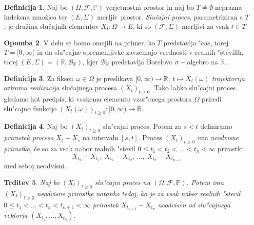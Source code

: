\documentclass[12pt, a4paper, reqno]{amsart}
\theoremstyle{definition} %
\newtheorem{definicija}{Definicija}[section]
\newtheorem{opomba}[definicija]{Opomba}
\theoremstyle{plain} %
\newtheorem{trditev}[definicija]{Trditev}
\newcommand{\R}{\mathbb{R}}
\newcommand{\F}{\mathcal{F}}
\newcommand{\B}{\mathcal{B}}
\newcommand{\1}{\mathds{1}}
\begin{document}
    \noindent


    \begin{definicija}
        Naj bo $(\Omega, \mathcal{F}, \mathbb{P})$ verjetnostni prostor in naj bo $T\neq\emptyset$
        neprazna indeksna množica ter $(E, \Sigma)$ merljiv prostor. \textit{Slučajni proces}, 
        parametriziran s $T$, je družina slučajnih elementov $X_t : \Omega \to E$,
         ki so $(\mathcal{F}, \Sigma)$-merljivi za vsak $t \in T$.
        \label{def:slucProc}
    \end{definicija}

    \begin{opomba}
        V delu se bomo omejili na primer, ko $T$ predstavlja "cas, torej $T = [0, \infty)$ in da slu"cajne
        spremenljivke 
        zavzemajo vrednosti v realnih "stevilih, torej $(E, \Sigma) = (\R, \B_{\R})$, kjer $\B_\R$ 
        predstavlja Borelovo $\sigma-$algebro na $\R$.
        \label{op:Konvencije}
    \end{opomba}


    \begin{definicija}
        Za fiksen $\omega \in \Omega$ je preslikava 
        $[0, \infty) \rightarrow \mathbb{R}; \ t \mapsto X_t(\omega)$ 
        \textit{trajektorija} oziroma \textit{realizacija} slučajnega procesa $(X_t)_{t\geq0}$.
        Tako lahko slu"cajni proces gledamo kot predpis, ki vsakemu elementu vzor"cnega prostora 
        $\Omega$ priredi slu"cajno funkcijo
        $(X_t(\omega))_{t\geq0}: [0, \infty) \rightarrow \mathbb{R}$.
        \label{def:realizac}
    \end{definicija}

    \begin{definicija}
        Naj bo $(X_t)_{t\geq0}$ slu"cajni proces. Potem za $s < t$ definiramo
        \textit{prirastek procesa} $X_t - X_s$ na intervalu $[s, t]$. Proces $(X_t)_{t\geq0}$ ima 
        \textit{neodvisne prirastke}, če so za vsak nabor realnih "stevil
        $0 \leq t_1 < t_2 < \ldots < t_n < \infty$ prirastki
        $$
            X_{t_2} - X_{t_1}, \ X_{t_3} - X_{t_2}, \ \ldots, \ X_{t_n} - X_{t_{n-1}}
        $$
        med seboj neodvisni.
        \label{def:prirastek}
    \end{definicija}

    \begin{trditev}
        Naj bo $(X_t)_{t\geq0}$ slu"cajni proces na $(\Omega, \F, \mathbb{P})$. Potem ima $(X_t)_{t\geq0}$
        neodvisne prirastke natanko tedaj, ko je za vsak nabor realnih "stevil 
        $0 \leq t_1 < \ldots < t_n < t_{n+1} <\infty$ prirastek $X_{t_{n+1}} - X_{t_n}$ neodvisen od
        slu"cajnega vektorja $(X_{t_1}, \dots, X_{t_n})$.
        \label{trd:ekvivKarakterizacija}
    \end{trditev}
\end{document}
